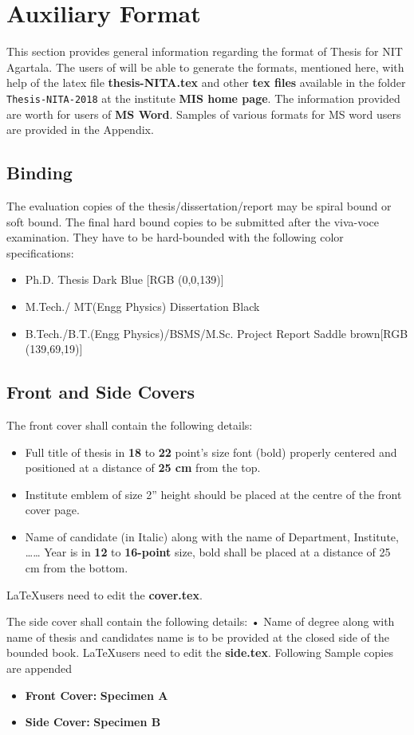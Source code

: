 \chapter{Auxiliary Format}
\label{chap:Auxfrmt}
This section provides general information regarding the format of Thesis for NIT Agartala. The users of \LaTeXe will be able to generate the formats, mentioned here, with help of the latex file \textbf{thesis-NITA.tex} and other \textbf{tex files} available in the folder \verb+Thesis-NITA-2018+ at the institute \textbf{MIS home page}. The information provided are worth for users of \textbf{MS Word}. Samples of various formats for MS word users are provided in the Appendix.
\section{Binding}
The evaluation copies of the thesis/dissertation/report may be spiral bound or soft bound. The final hard bound copies to be submitted after the viva-voce examination. They have to be hard-bounded with the following color specifications:
\begin{itemize}
	\item Ph.D. Thesis  Dark Blue  [RGB (0,0,139)]
	\item M.Tech./ MT(Engg Physics) Dissertation Black
	\item B.Tech./B.T.(Engg Physics)/BSMS/M.Sc. Project Report Saddle brown[RGB (139,69,19)]
\end{itemize}

\section{Front and Side Covers}
The front cover shall contain the following details:
\begin{itemize}
	\item Full title of thesis in \textbf{18} to \textbf{22} point's size font (bold) properly centered and positioned at a distance of \textbf{25 cm} from the top.
	\item Institute emblem of size 2” height should be placed at the centre of the front cover page.
	\item Name of candidate (in Italic) along with the name of Department, Institute, …… Year is in \textbf{12} to \textbf{16-point} size, bold shall be placed at a distance of 25 cm from the bottom.
\end{itemize}
\par \LaTeX users need to edit the \textbf{cover.tex}.
\par The side cover shall contain the following details:
•	Name of degree along with name of thesis and candidates name is to be provided at the closed side of the bounded book. \LaTeX users need to edit the \textbf{side.tex}.
Following Sample copies are appended 
\begin{itemize}
	\item{\bf{Front Cover:}} \textbf{Specimen A} 
	\item{\bf{Side Cover:}}  \textbf{Specimen B}
\end{itemize}
  
